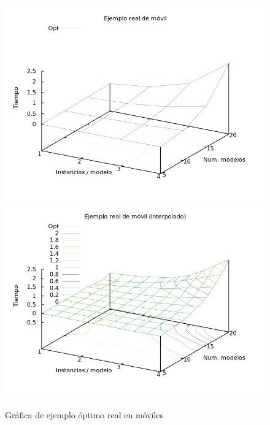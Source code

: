 \begin{figure}[H]
\centering
\includegraphics[scale=0.5]{img/opt-real}
\includegraphics[scale=0.5]{img/opt-real-spl}
\caption{Gráfica de ejemplo óptimo real en móviles
\label{fig:grfoptreal}}
\end{figure}



